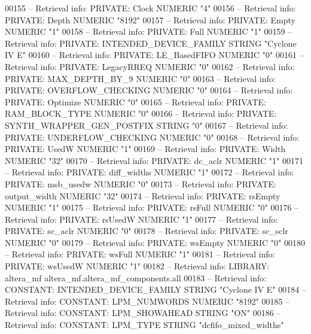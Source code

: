 \begin{DoxyCode}
{00155 \textcolor{keyword}{-- Retrieval info: PRIVATE: Clock NUMERIC "4"}
00156 \textcolor{keyword}{-- Retrieval info: PRIVATE: Depth NUMERIC "8192"}
00157 \textcolor{keyword}{-- Retrieval info: PRIVATE: Empty NUMERIC "1"}
00158 \textcolor{keyword}{-- Retrieval info: PRIVATE: Full NUMERIC "1"}
00159 \textcolor{keyword}{-- Retrieval info: PRIVATE: INTENDED\_DEVICE\_FAMILY STRING "Cyclone IV E"}
00160 \textcolor{keyword}{-- Retrieval info: PRIVATE: LE\_BasedFIFO NUMERIC "0"}
00161 \textcolor{keyword}{-- Retrieval info: PRIVATE: LegacyRREQ NUMERIC "0"}
00162 \textcolor{keyword}{-- Retrieval info: PRIVATE: MAX\_DEPTH\_BY\_9 NUMERIC "0"}
00163 \textcolor{keyword}{-- Retrieval info: PRIVATE: OVERFLOW\_CHECKING NUMERIC "0"}
00164 \textcolor{keyword}{-- Retrieval info: PRIVATE: Optimize NUMERIC "0"}
00165 \textcolor{keyword}{-- Retrieval info: PRIVATE: RAM\_BLOCK\_TYPE NUMERIC "0"}
00166 \textcolor{keyword}{-- Retrieval info: PRIVATE: SYNTH\_WRAPPER\_GEN\_POSTFIX STRING "0"}
00167 \textcolor{keyword}{-- Retrieval info: PRIVATE: UNDERFLOW\_CHECKING NUMERIC "0"}
00168 \textcolor{keyword}{-- Retrieval info: PRIVATE: UsedW NUMERIC "1"}
00169 \textcolor{keyword}{-- Retrieval info: PRIVATE: Width NUMERIC "32"}
00170 \textcolor{keyword}{-- Retrieval info: PRIVATE: dc\_aclr NUMERIC "1"}
00171 \textcolor{keyword}{-- Retrieval info: PRIVATE: diff\_widths NUMERIC "1"}
00172 \textcolor{keyword}{-- Retrieval info: PRIVATE: msb\_usedw NUMERIC "0"}
00173 \textcolor{keyword}{-- Retrieval info: PRIVATE: output\_width NUMERIC "32"}
00174 \textcolor{keyword}{-- Retrieval info: PRIVATE: rsEmpty NUMERIC "1"}
00175 \textcolor{keyword}{-- Retrieval info: PRIVATE: rsFull NUMERIC "0"}
00176 \textcolor{keyword}{-- Retrieval info: PRIVATE: rsUsedW NUMERIC "1"}
00177 \textcolor{keyword}{-- Retrieval info: PRIVATE: sc\_aclr NUMERIC "0"}
00178 \textcolor{keyword}{-- Retrieval info: PRIVATE: sc\_sclr NUMERIC "0"}
00179 \textcolor{keyword}{-- Retrieval info: PRIVATE: wsEmpty NUMERIC "0"}
00180 \textcolor{keyword}{-- Retrieval info: PRIVATE: wsFull NUMERIC "1"}
00181 \textcolor{keyword}{-- Retrieval info: PRIVATE: wsUsedW NUMERIC "1"}
00182 \textcolor{keyword}{-- Retrieval info: LIBRARY: altera\_mf altera\_mf.altera\_mf\_components.all}
00183 \textcolor{keyword}{-- Retrieval info: CONSTANT: INTENDED\_DEVICE\_FAMILY STRING "Cyclone IV E"}
00184 \textcolor{keyword}{-- Retrieval info: CONSTANT: LPM\_NUMWORDS NUMERIC "8192"}
00185 \textcolor{keyword}{-- Retrieval info: CONSTANT: LPM\_SHOWAHEAD STRING "ON"}
00186 \textcolor{keyword}{-- Retrieval info: CONSTANT: LPM\_TYPE STRING "dcfifo\_mixed\_widths"}
}
\end{DoxyCode}
